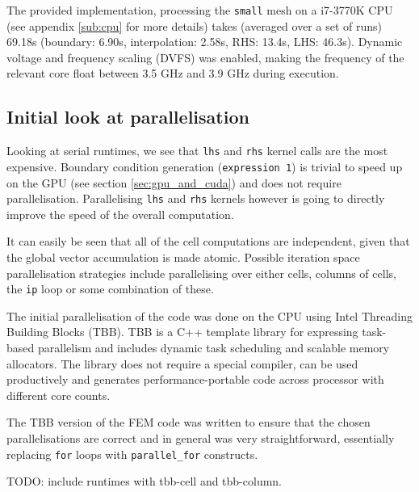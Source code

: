 \documentclass[11pt, oneside, a4paper]{article}
\begin{document}
The provided implementation, processing the \texttt{small} mesh on a i7-3770K CPU (see appendix \ref{sub:cpu} for more details) takes (averaged over a set of runs) 69.18s (boundary: 6.90s, interpolation: 2.58s, RHS: 13.4s, LHS: 46.3s). Dynamic voltage and frequency scaling (DVFS) was enabled, making the frequency of the relevant core float between 3.5 GHz and 3.9 GHz during execution.


\subsection{Initial look at parallelisation} %
\label{sub:initial_look_at_parallelisation}

Looking at serial runtimes, we see that \texttt{lhs} and \texttt{rhs} kernel calls are the most expensive. Boundary condition generation (\texttt{expression 1}) is trivial to speed up on the GPU (see section \ref{sec:gpu_and_cuda}) and does not require parallelisation. Parallelising \texttt{lhs} and \texttt{rhs} kernels however is going to directly improve the speed of the overall computation. 

It can easily be seen that all of the cell computations are independent, given that the global vector accumulation is made atomic. Possible iteration space parallelisation strategies include parallelising over either cells, columns of cells, the \texttt{ip} loop or some combination of these.

The initial parallelisation of the code was done on the CPU using Intel Threading Building Blocks (TBB). TBB is a C++ template library for expressing task-based parallelism and includes dynamic task scheduling and scalable memory allocators. The library does not require a special compiler, can be used productively and generates performance-portable code across processor with different core counts.

The TBB version of the FEM code was written to ensure that the chosen parallelisations are correct and in general was very straightforward, essentially replacing \texttt{for} loops with \texttt{parallel\_for} constructs.

TODO: include runtimes with tbb-cell and tbb-column.

\end{document}
